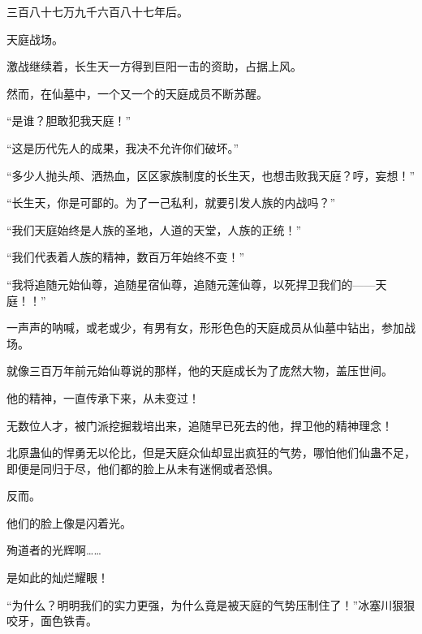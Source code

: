 \begin{this_body}
三百八十七万九千六百八十七年后。

天庭战场。

激战继续着，长生天一方得到巨阳一击的资助，占据上风。

然而，在仙墓中，一个又一个的天庭成员不断苏醒。

“是谁？胆敢犯我天庭！”

“这是历代先人的成果，我决不允许你们破坏。”

“多少人抛头颅、洒热血，区区家族制度的长生天，也想击败我天庭？哼，妄想！”

“长生天，你是可鄙的。为了一己私利，就要引发人族的内战吗？”

“我们天庭始终是人族的圣地，人道的天堂，人族的正统！”

“我们代表着人族的精神，数百万年始终不变！”

“我将追随元始仙尊，追随星宿仙尊，追随元莲仙尊，以死捍卫我们的——天庭！！”

一声声的呐喊，或老或少，有男有女，形形色色的天庭成员从仙墓中钻出，参加战场。

就像三百万年前元始仙尊说的那样，他的天庭成长为了庞然大物，盖压世间。

他的精神，一直传承下来，从未变过！

无数位人才，被门派挖掘栽培出来，追随早已死去的他，捍卫他的精神理念！

北原蛊仙的悍勇无以伦比，但是天庭众仙却显出疯狂的气势，哪怕他们仙蛊不足，即便是同归于尽，他们都的脸上从未有迷惘或者恐惧。

反而。

他们的脸上像是闪着光。

殉道者的光辉啊……

是如此的灿烂耀眼！

“为什么？明明我们的实力更强，为什么竟是被天庭的气势压制住了！”冰塞川狠狠咬牙，面色铁青。

\end{this_body}

